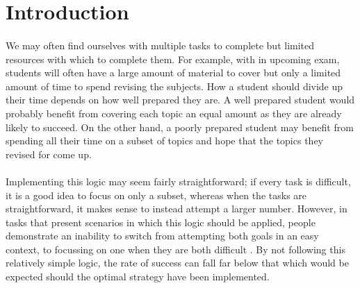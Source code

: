 \documentclass[12pt]{article}
\begin{document}
\begingroup\singlespacing
\newpage
\tableofcontents
\newpage
\endgroup

\section*{Introduction}

\paragraph{} We may often find ourselves with multiple tasks to complete but limited resources with which to complete them. For example, with in upcoming exam, students will often have a large amount of material to cover but only a limited amount of time to spend revising the subjects. How a student should divide up their time depends on how well prepared they are. A well prepared student would probably benefit from covering each topic an equal amount as they are already likely to succeed. On the other hand, a poorly prepared student may benefit from spending all their time on a subset of topics and hope that the topics they revised for come up. %

\paragraph{} Implementing this logic may seem fairly straightforward; if every task is difficult, it is a good idea to focus on only a subset, whereas when the tasks are straightforward, it makes sense to instead attempt a larger number. However, in tasks that present scenarios in which this logic should be applied,  people demonstrate an inability to switch from attempting both goals in an easy context, to focussing on one when they are both difficult \citep{clarke2015failure,morvan2012human}. By not following this relatively simple logic, the rate of success can fall far below that which would be expected should the optimal strategy have been implemented. 
\end{document}
